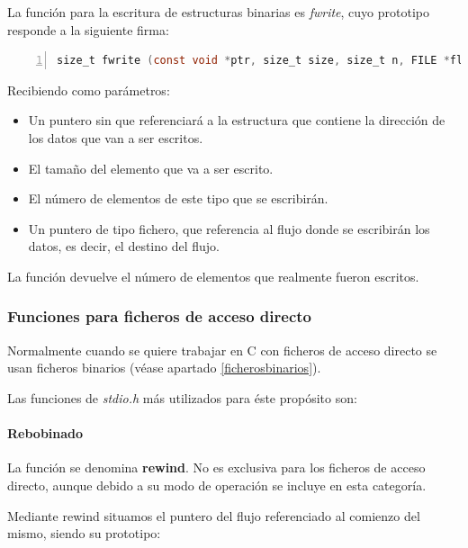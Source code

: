 \documentclass[a4paper, 11pt, titlepage]{article}
\begin{document}
            La función para la escritura de estructuras binarias es \textit{fwrite}, 
            cuyo prototipo responde a la siguiente firma:
            
            \begin{lstlisting}[language=C,numbers=left,basicstyle=\small]
    size_t fwrite (const void *ptr, size_t size, size_t n, FILE *flujo);\end{lstlisting}
        
            Recibiendo como parámetros:

            \begin{itemize}
                \item Un puntero sin que referenciará a la estructura que contiene la dirección 
                de los datos que van a ser escritos.
                \item El tamaño del elemento que va a ser escrito.
                \item El número de elementos de este tipo que se escribirán.
                \item Un puntero de tipo fichero, que referencia al flujo donde se escribirán los datos, 
                es decir, el destino del flujo.
            \end{itemize}

            La función devuelve el número de elementos que realmente fueron escritos.

        \subsubsection{Funciones para ficheros de acceso directo}

            Normalmente cuando se quiere trabajar en C con ficheros de acceso directo 
            se usan ficheros binarios (véase apartado \ref{ficherosbinarios}).

            Las funciones de \textit{stdio.h} más utilizados para éste propósito son:

            \paragraph{Rebobinado} La función se denomina \textbf{rewind}. No es 
            exclusiva para los ficheros de acceso directo, aunque debido a su modo de 
            operación se incluye en esta categoría. 

            Mediante rewind situamos el puntero del flujo referenciado al comienzo 
            del mismo, siendo su prototipo:
\end{document}

